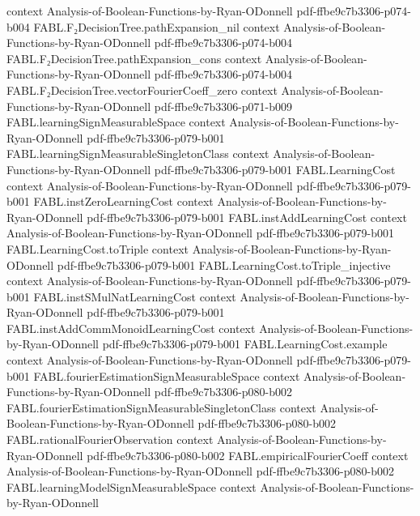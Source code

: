 \begin{theorem}
  {context}
  {Analysis-of-Boolean-Functions-by-Ryan-ODonnell}
  {pdf-ffbe9c7b3306-p074-b004}
\proofstep
  {FABL.F₂DecisionTree.pathExpansion_nil}
  {context}
  {Analysis-of-Boolean-Functions-by-Ryan-ODonnell}
  {pdf-ffbe9c7b3306-p074-b004}
\proofstep
  {FABL.F₂DecisionTree.pathExpansion_cons}
  {context}
  {Analysis-of-Boolean-Functions-by-Ryan-ODonnell}
  {pdf-ffbe9c7b3306-p074-b004}
\proofstep
  {FABL.F₂DecisionTree.vectorFourierCoeff_zero}
  {context}
  {Analysis-of-Boolean-Functions-by-Ryan-ODonnell}
  {pdf-ffbe9c7b3306-p071-b009}
\proofstep
  {FABL.learningSignMeasurableSpace}
  {context}
  {Analysis-of-Boolean-Functions-by-Ryan-ODonnell}
  {pdf-ffbe9c7b3306-p079-b001}
\proofstep
  {FABL.learningSignMeasurableSingletonClass}
  {context}
  {Analysis-of-Boolean-Functions-by-Ryan-ODonnell}
  {pdf-ffbe9c7b3306-p079-b001}
\proofstep
  {FABL.LearningCost}
  {context}
  {Analysis-of-Boolean-Functions-by-Ryan-ODonnell}
  {pdf-ffbe9c7b3306-p079-b001}
\proofstep
  {FABL.instZeroLearningCost}
  {context}
  {Analysis-of-Boolean-Functions-by-Ryan-ODonnell}
  {pdf-ffbe9c7b3306-p079-b001}
\proofstep
  {FABL.instAddLearningCost}
  {context}
  {Analysis-of-Boolean-Functions-by-Ryan-ODonnell}
  {pdf-ffbe9c7b3306-p079-b001}
\proofstep
  {FABL.LearningCost.toTriple}
  {context}
  {Analysis-of-Boolean-Functions-by-Ryan-ODonnell}
  {pdf-ffbe9c7b3306-p079-b001}
\proofstep
  {FABL.LearningCost.toTriple_injective}
  {context}
  {Analysis-of-Boolean-Functions-by-Ryan-ODonnell}
  {pdf-ffbe9c7b3306-p079-b001}
\proofstep
  {FABL.instSMulNatLearningCost}
  {context}
  {Analysis-of-Boolean-Functions-by-Ryan-ODonnell}
  {pdf-ffbe9c7b3306-p079-b001}
\proofstep
  {FABL.instAddCommMonoidLearningCost}
  {context}
  {Analysis-of-Boolean-Functions-by-Ryan-ODonnell}
  {pdf-ffbe9c7b3306-p079-b001}
\proofstep
  {FABL.LearningCost.example}
  {context}
  {Analysis-of-Boolean-Functions-by-Ryan-ODonnell}
  {pdf-ffbe9c7b3306-p079-b001}
\proofstep
  {FABL.fourierEstimationSignMeasurableSpace}
  {context}
  {Analysis-of-Boolean-Functions-by-Ryan-ODonnell}
  {pdf-ffbe9c7b3306-p080-b002}
\proofstep
  {FABL.fourierEstimationSignMeasurableSingletonClass}
  {context}
  {Analysis-of-Boolean-Functions-by-Ryan-ODonnell}
  {pdf-ffbe9c7b3306-p080-b002}
\proofstep
  {FABL.rationalFourierObservation}
  {context}
  {Analysis-of-Boolean-Functions-by-Ryan-ODonnell}
  {pdf-ffbe9c7b3306-p080-b002}
\proofstep
  {FABL.empiricalFourierCoeff}
  {context}
  {Analysis-of-Boolean-Functions-by-Ryan-ODonnell}
  {pdf-ffbe9c7b3306-p080-b002}
\proofstep
  {FABL.learningModelSignMeasurableSpace}
  {context}
  {Analysis-of-Boolean-Functions-by-Ryan-ODonnell}

\end{theorem}
